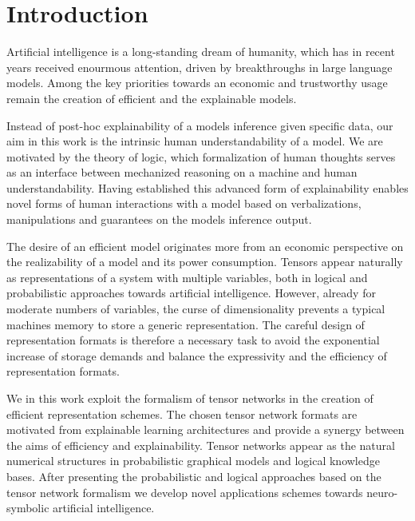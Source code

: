 \section{Introduction}

Artificial intelligence is a long-standing dream of humanity, which has in recent years received enourmous attention, driven by breakthroughs in large language models.
Among the key priorities towards an economic and trustworthy usage remain the creation of efficient and the explainable models.

Instead of post-hoc explainability of a models inference given specific data, our aim in this work is the intrinsic human understandability of a model.
We are motivated by the theory of logic, which formalization of human thoughts serves as an interface between mechanized reasoning on a machine and human understandability.
Having established this advanced form of explainability enables novel forms of human interactions with a model based on verbalizations, manipulations and guarantees on the models inference output.

The desire of an efficient model originates more from an economic perspective on the realizability of a model and its power consumption.
Tensors appear naturally as representations of a system with multiple variables, both in logical and probabilistic approaches towards artificial intelligence. %
However, already for moderate numbers of variables, the curse of dimensionality prevents a typical machines memory to store a generic representation.
The careful design of representation formats is therefore a necessary task to avoid the exponential increase of storage demands and balance the expressivity and the efficiency of representation formats.

We in this work exploit the formalism of tensor networks in the creation of efficient representation schemes.
The chosen tensor network formats are motivated from explainable learning architectures and provide a synergy between the aims of efficiency and explainability.
Tensor networks appear as the natural numerical structures in probabilistic graphical models and logical knowledge bases.
After presenting the probabilistic and logical approaches based on the tensor network formalism we develop novel applications schemes towards neuro-symbolic artificial intelligence.



